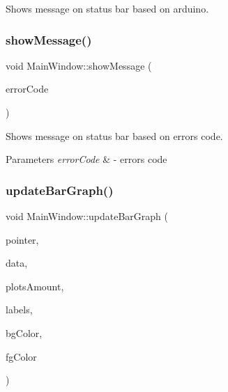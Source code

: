 Shows message on status bar based on arduino. 

\mbox{\label{class_main_window_a365152de4a1878ab0087816da6a9431a}} 
\subsubsection{\texorpdfstring{show\+Message()}{showMessage()}\hspace{0.1cm}{\footnotesize\ttfamily [2/2]}}
{\footnotesize\ttfamily void Main\+Window\+::show\+Message (\begin{DoxyParamCaption}\item[{const quint32}]{error\+Code }\end{DoxyParamCaption})\hspace{0.3cm}{\ttfamily [private]}}



Shows message on status bar based on error\textquotesingle{}s code. 


\begin{DoxyParams}{Parameters}
{\em error\+Code} & -\/ error\textquotesingle{}s code \\
\hline
\end{DoxyParams}
\mbox{\label{class_main_window_a1e61f5c68914afa9a1054cbb9982cf17}} 
\subsubsection{\texorpdfstring{update\+Bar\+Graph()}{updateBarGraph()}}
{\footnotesize\ttfamily void Main\+Window\+::update\+Bar\+Graph (\begin{DoxyParamCaption}\item[{Q\+Custom\+Plot $\ast$}]{pointer,  }\item[{const Q\+Vector$<$ double $>$ \&}]{data,  }\item[{const quint32 \&}]{plots\+Amount,  }\item[{const Q\+Vector$<$ Q\+String $>$ \&}]{labels,  }\item[{const Q\+Color \&}]{bg\+Color,  }\item[{const Q\+Color \&}]{fg\+Color }\end{DoxyParamCaption})\hspace{0.3cm}{\ttfamily [private]}}



